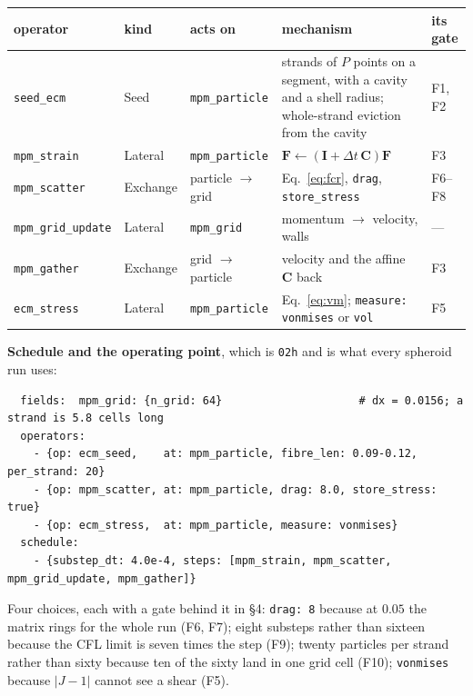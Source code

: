 \documentclass[10pt,a4paper]{article}
\newcommand{\code}[1]{\texttt{#1}}
\newcommand{\op}[1]{\texttt{#1}}
\begin{document}
\begin{center}\footnotesize
\begin{tabular}{@{}lllp{4.5cm}p{3.2cm}@{}}\toprule
\textbf{operator} & \textbf{kind} & \textbf{acts on} & \textbf{mechanism} & \textbf{its gate}\\\midrule
\op{seed\_ecm}      & Seed     & \code{mpm\_particle} & strands of $P$ points on a segment, with a
  cavity and a shell radius; whole-strand eviction from the cavity & F1, F2\\
\op{mpm\_strain}    & Lateral  & \code{mpm\_particle} & $\mathbf F\leftarrow(\mathbf I+\Delta t\,
  \mathbf C)\mathbf F$ & F3\\
\op{mpm\_scatter}   & Exchange & particle $\to$ grid & Eq.~\eqref{eq:fcr}, \code{drag},
  \code{store\_stress} & F6--F8\\
\op{mpm\_grid\_update} & Lateral & \code{mpm\_grid} & momentum $\to$ velocity, walls & ---\\
\op{mpm\_gather}    & Exchange & grid $\to$ particle & velocity and the affine $\mathbf C$ back & F3\\
\op{ecm\_stress}    & Lateral  & \code{mpm\_particle} & Eq.~\eqref{eq:vm}; \code{measure: vonmises}
  or \code{vol} & F5\\
\bottomrule\end{tabular}
\end{center}

\textbf{Schedule and the operating point}, which is \op{02h} and is what every spheroid run uses:

\smallskip
{\footnotesize
\begin{verbatim}
  fields:  mpm_grid: {n_grid: 64}                     # dx = 0.0156; a strand is 5.8 cells long
  operators:
    - {op: ecm_seed,    at: mpm_particle, fibre_len: 0.09-0.12, per_strand: 20}
    - {op: mpm_scatter, at: mpm_particle, drag: 8.0, store_stress: true}
    - {op: ecm_stress,  at: mpm_particle, measure: vonmises}
  schedule:
    - {substep_dt: 4.0e-4, steps: [mpm_strain, mpm_scatter, mpm_grid_update, mpm_gather]}
\end{verbatim}}
\smallskip

Four choices, each with a gate behind it in \S4: \code{drag: 8} because at $0.05$ the matrix rings for
the whole run (F6, F7); eight substeps rather than sixteen because the CFL limit is seven times the
step (F9); twenty particles per strand rather than sixty because ten of the sixty land in one grid
cell (F10); \code{vonmises} because $|J-1|$ cannot see a shear (F5).
\end{document}
